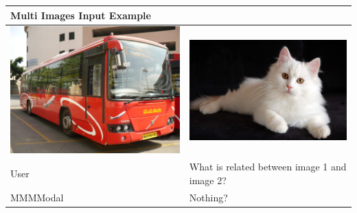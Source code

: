 \documentclass[preprint]{article}
\begin{document}
\begin{table}[hbt]
  \centering
  \setlength{\extrarowheight}{3pt} %
  \renewcommand{\arraystretch}{1.5} %
  \begin{tabular}{p{6.5cm}p{6.5cm}}
    \hline
    \textbf{Multi Images Input Example}                                                                            \\[6pt]
    \hline
    \includegraphics[width=\linewidth]{pic/R.jpeg} & \includegraphics[width=\linewidth]{pic/Persian-cat-breed.jpg} \\
    \hline
    User                                           & What is related between image 1 and image 2?                  \\
    MMMModal                                       & Nothing?                                                      \\
    \hline
  \end{tabular}
\end{table}
\end{document}
